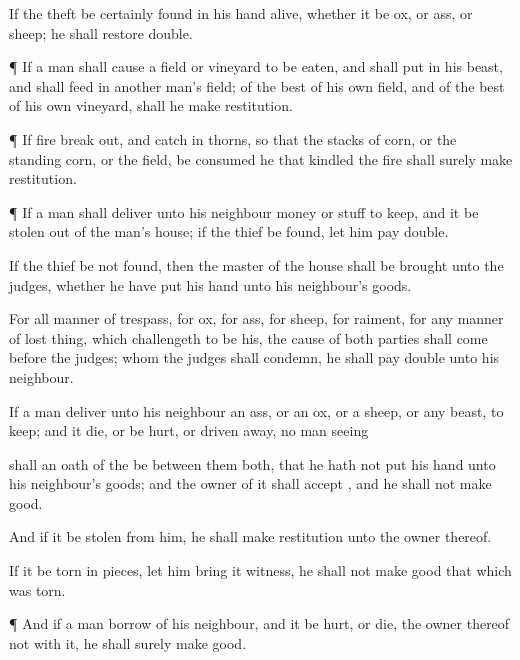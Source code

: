 {If the
theft be
certainly
found in his
hand
alive, whether it be
ox, or
ass, or
sheep; he shall
restore
double.


\par }{\PP {}¶ If a
man shall cause a
field or
vineyard to be
eaten, and shall
put in his
beast, and shall
feed in another
man’s
field; of the
best of his own
field, and of the
best of his own
vineyard, shall he make
restitution.


\par }{\PP {}¶ If
fire break
out, and
catch in
thorns, so that the stacks of
corn, or the standing
corn, or the
field, be
consumed
{} he that
kindled the
fire shall
surely make
restitution.


\par }{\PP {}¶ If a
man shall
deliver unto his
neighbour
money or
stuff to
keep, and it be
stolen out of the
man’s
house; if the
thief be
found, let him
pay
double.

If the
thief be
not
found, then the
master of the
house shall be
brought unto the
judges,
{} whether he have
put his
hand unto his
neighbour’s
goods.

For all
manner of
trespass,
{} for
ox, for
ass, for
sheep, for
raiment,
{} for any manner of lost
thing, which
{}
challengeth to be his, the
cause of both
parties shall
come before the
judges;
{} whom the
judges shall
condemn, he shall
pay
double unto his
neighbour.

If a
man
deliver unto his
neighbour an
ass, or an
ox, or a
sheep, or any
beast, to
keep; and it
die, or be
hurt, or driven
away, no man
seeing
{}

 shall an
oath of the
{} be between them
both, that he hath not
put his
hand unto his
neighbour’s
goods; and the
owner of it shall
accept
{}, and he shall not make
{}
good.

And if it be
stolen from him, he shall make
restitution unto the
owner thereof.

If it be torn in
pieces,
{} let him
bring it
{}
witness,
{} he shall not make
good that which was
torn.


\par }{\PP {}¶ And if a
man
borrow
{} of his
neighbour, and it be
hurt, or
die, the
owner thereof
{} not with
it, he shall
surely make
{}
good.

}
